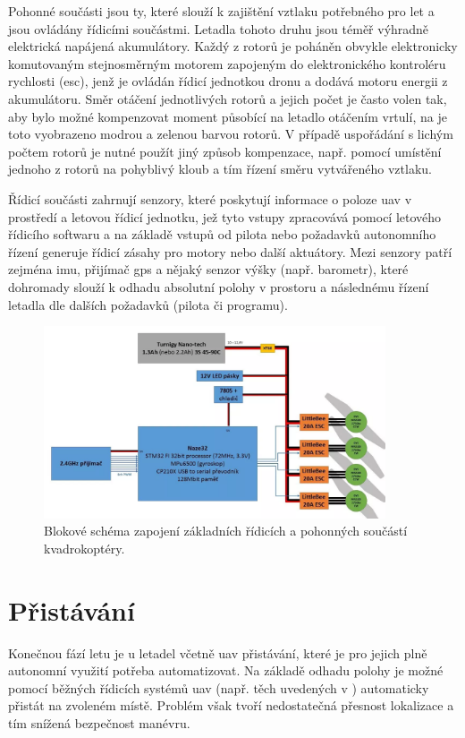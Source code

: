 Pohonné součásti jsou ty, které slouží k zajištění vztlaku potřebného pro let a jsou ovládány řídicími součástmi. Letadla tohoto druhu jsou téměř výhradně elektrická napájená akumulátory. Každý z rotorů je poháněn obvykle elektronicky komutovaným stejnosměrným motorem zapojeným do elektronického kontroléru rychlosti (\acrshort{esc}), jenž je ovládán řídicí jednotkou dronu a dodává motoru energii z akumulátoru. Směr otáčení jednotlivých rotorů a jejich počet je často volen tak, aby bylo možné kompenzovat moment působící na letadlo otáčením vrtulí, na  je toto vyobrazeno modrou a zelenou barvou rotorů. V případě uspořádání s lichým počtem rotorů je nutné použít jiný způsob kompenzace, např. pomocí umístění jednoho z rotorů na pohyblivý kloub a tím řízení směru vytvářeného vztlaku.

Řídicí součásti zahrnují senzory, které poskytují informace o poloze \acrshort{uav} v prostředí a letovou řídicí jednotku, jež tyto vstupy zpracovává pomocí letového řídicího softwaru a na základě vstupů od pilota nebo požadavků autonomního řízení generuje řídicí zásahy pro motory nebo další aktuátory. Mezi senzory patří zejména \acrfull{imu}, přijímač \acrshort{gps} a nějaký senzor výšky (např. barometr), které dohromady slouží k odhadu absolutní polohy v prostoru a následnému řízení letadla dle dalších požadavků (pilota či programu).

\begin{figure}
    \centering
    \includegraphics[width=0.9\textwidth]{img/intro/schema-kvadrokoptera.png}
    \caption[Schéma zapojení součástí letadla]{Blokové schéma zapojení základních řídicích a pohonných součástí kvadrokoptéry. \cite{dronSoucasti}}
    \label{fig:dronSoucasti}
\end{figure}

\section{Přistávání}
Konečnou fází letu je u letadel včetně \acrshort{uav} přistávání, které je pro jejich plně autonomní využití potřeba automatizovat. Na základě odhadu polohy je možné pomocí běžných řídicích systémů \acrshort{uav} (např. těch uvedených v ) automaticky přistát na zvoleném místě. Problém však tvoří nedostatečná přesnost lokalizace a tím snížená bezpečnost manévru.

